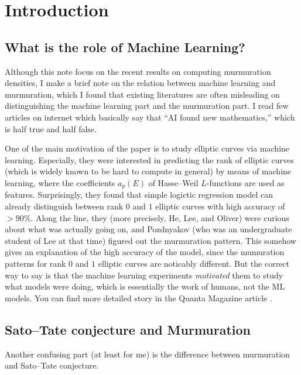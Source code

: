 \section{Introduction}
\label{sec:intro}

\subsection{What is the role of Machine Learning?}

Although this note focus on the recent results on computing murmuration densities, I make a brief note on the relation between machine learning and murmuration, which I found that existing literatures are often misleading on distinguishing the machine learning part and the murmuration part.
I read few articles on internet which basically say that ``AI found new mathematics,'' which is half true and half false.

One of the main motivation of the paper \cite{he2024murmurations} is to study  elliptic curves via machine learning.
Especially, they were interested in predicting the rank of elliptic curves (which is widely known to be hard to compute in general) by means of machine learning, where the coefficients $a_p(E)$ of Hasse--Weil $L$-functions are used as features.
Surprisingly, they found that simple logictic regression model can already distinguish between rank $0$ and $1$ elliptic curves with high accuracy of $>90\%$.
Along the line, they (more precisely, He, Lee, and Oliver) were curious about what was actually going on, and Pozdnyakov (who was an undergraduate student of Lee at that time) figured out the murmuration pattern.
This somehow gives an explanation of the high accuracy of the model, since the mumuration patterns for rank $0$ and $1$ elliptic curves are noticably different.
But the correct way to say is that the machine learning experiments \emph{motivated} them to study what models were doing, which is essentially the work of humans, not the ML models.
You can find more detailed story in the Quanta Magazine article \cite{chiou2024elliptic}.


\subsection{Sato--Tate conjecture and Murmuration}

Another confusing part (at least for me) is the difference between murmuration and Sato--Tate conjecture.